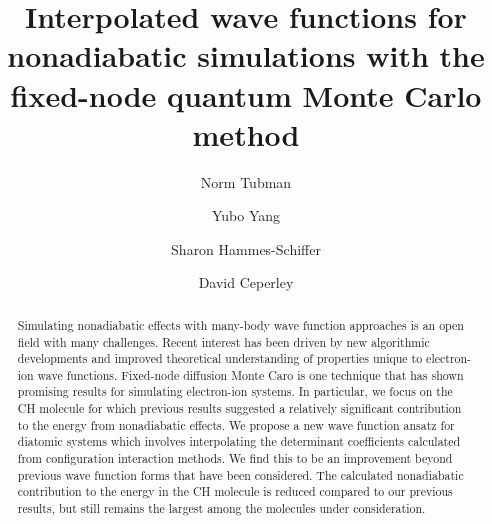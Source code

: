 \documentclass[aip,jcp,numerical,reprint]{revtex4-1}
\begin{document}
\title{Interpolated wave functions for nonadiabatic simulations with the fixed-node quantum Monte Carlo method}
\author{Norm Tubman}
\author{Yubo Yang}
\author{Sharon Hammes-Schiffer}
\author{David Ceperley}

\begin{abstract}
Simulating nonadiabatic effects with many-body wave function approaches is an open field with many challenges.  %
Recent interest has been driven by new algorithmic developments and improved theoretical understanding of properties unique to electron-ion wave functions.  Fixed-node diffusion Monte Caro is one technique that has shown promising results for simulating electron-ion systems.
In particular, we focus on the CH molecule for which previous results suggested a relatively significant contribution to the energy from nonadiabatic effects.  We propose a new wave function ansatz for diatomic systems which involves interpolating the determinant coefficients calculated from configuration interaction methods.    We find this to be an improvement beyond previous wave function forms that have been considered.    The calculated nonadiabatic contribution to the energy in the CH molecule is reduced compared to our previous results, but still remains the largest among the molecules under consideration.

\end{abstract}
\maketitle
\end{document}

